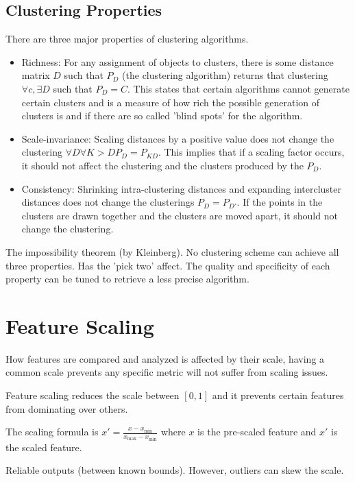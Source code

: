 \documentclass{article}
\begin{document}
\subsection{Clustering Properties}
There are three major properties of clustering algorithms.
\begin{itemize}
	\item Richness: For any assignment of objects to clusters, there is some 
		distance matrix $D$ such that $P_D$ (the clustering algorithm)
		returns that clustering $\forall c, \exists D$ such 
		that $P_D = C$. This states that certain algorithms cannot 
		generate certain clusters and is a measure of how rich the 
		possible generation of clusters is and if there are so called
		'blind spots' for the algorithm. 
	\item Scale-invariance: Scaling distances by a positive value does not 
		change the clustering $\forall D \forall{K>D} P_D = P_{KD}$. 
		This implies that if a scaling factor occurs, it should not
		affect the clustering and the clusters produced by the $P_D$.
	\item Consistency: Shrinking intra-clustering distances and expanding 
		intercluster distances does not change the clusterings $P_D = 
		P_{D'}$. If the points in the clusters are drawn together and
		the clusters are moved apart, it should not change the 
		clustering. 
\end{itemize}

The impossibility theorem (by Kleinberg). No clustering scheme can achieve all 
three properties. Has the 'pick two' affect. The quality and specificity of each
property can be tuned to retrieve a less precise algorithm. 

\section{Feature Scaling}
How features are compared and analyzed is affected by their scale, having a
common scale prevents any specific metric will not suffer from scaling issues. 

Feature scaling reduces the scale between $[0,1]$ and it prevents certain 
features from dominating over others. 

The scaling formula is $x' = \frac{x - x_{\text{min}}}{x_{\text{max}} - x_{\text
{min}}}$ where $x$ is the pre-scaled feature and $x'$ is the scaled feature. 

Reliable outputs (between known bounds). However, outliers can skew the scale. 
\end{document}
